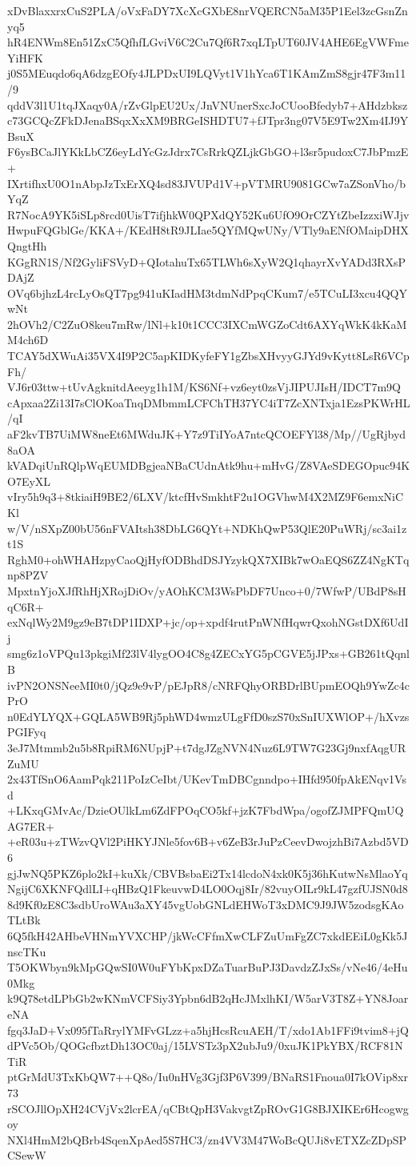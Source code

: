xDvBlaxxrxCuS2PLA/oVxFaDY7XcXcGXbE8nrVQERCN5aM35P1Eel3zcGsnZnyq5
hR4ENWm8En51ZxC5QfhfLGviV6C2Cu7Qf6R7xqLTpUT60JV4AHE6EgVWFmeYiHFK
j0S5MEuqdo6qA6dzgEOfy4JLPDxUI9LQVyt1V1hYca6T1KAmZmS8gjr47F3m11/9
qddV3l1U1tqJXaqy0A/rZvGlpEU2Ux/JnVNUnerSxcJoCUooBfedyb7+AHdzbksz
c73GCQcZFkDJenaBSqxXxXM9BRGeISHDTU7+fJTpr3ng07V5E9Tw2Xm4IJ9YBsuX
F6ysBCaJlYKkLbCZ6eyLdYcGzJdrx7CsRrkQZLjkGbGO+l3sr5pudoxC7JbPmzE+
IXrtifhxU0O1nAbpJzTxErXQ4sd83JVUPd1V+pVTMRU9081GCw7aZSonVho/bYqZ
R7NocA9YK5iSLp8rcd0UisT7ifjhkW0QPXdQY52Ku6UfO9OrCZYtZbeIzzxiWJjv
HwpuFQGblGe/KKA+/KEdH8tR9JLIae5QYfMQwUNy/VTly9aENfOMaipDHXQngtHh
KGgRN1S/Nf2GyliFSVyD+QIotahuTx65TLWh6sXyW2Q1qhayrXvYADd3RXsPDAjZ
OVq6bjhzL4rcLyOsQT7pg941uKIadHM3tdmNdPpqCKum7/e5TCuLI3xcu4QQYwNt
2hOVh2/C2ZuO8keu7mRw/lNl+k10t1CCC3IXCmWGZoCdt6AXYqWkK4kKaMM4ch6D
TCAY5dXWuAi35VX4I9P2C5apKIDKyfeFY1gZbsXHvyyGJYd9vKytt8LsR6VCpFh/
VJ6r03ttw+tUvAgknitdAeeyg1h1M/KS6Nf+vz6eyt0zsVjJIPUJIsH/IDCT7m9Q
cApxaa2Zi13I7sClOKoaTnqDMbmmLCFChTH37YC4iT7ZcXNTxja1EzsPKWrHL/qI
aF2kvTB7UiMW8neEt6MWduJK+Y7z9TiIYoA7ntcQCOEFYl38/Mp//UgRjbyd8aOA
kVADqiUnRQlpWqEUMDBgjeaNBaCUdnAtk9hu+mHvG/Z8VAeSDEGOpuc94KO7EyXL
vIry5h9q3+8tkiaiH9BE2/6LXV/ktcfHvSmkhtF2u1OGVhwM4X2MZ9F6emxNiCKl
w/V/nSXpZ00bU56nFVAItsh38DbLG6QYt+NDKhQwP53QlE20PuWRj/sc3ai1zt1S
RghM0+ohWHAHzpyCaoQjHyfODBhdDSJYzykQX7XIBk7wOaEQS6ZZ4NgKTqnp8PZV
MpxtnYjoXJfRhHjXRojDiOv/yAOhKCM3WsPbDF7Unco+0/7WfwP/UBdP8sHqC6R+
exNqlWy2M9gz9eB7tDP1IDXP+jc/op+xpdf4rutPnWNfHqwrQxohNGstDXf6UdIj
smg6z1oVPQu13pkgiMf23lV4lygOO4C8g4ZECxYG5pCGVE5jJPxs+GB261tQqnlB
ivPN2ONSNeeMI0t0/jQz9e9vP/pEJpR8/cNRFQhyORBDrlBUpmEOQh9YwZc4cPrO
n0EdYLYQX+GQLA5WB9Rj5phWD4wmzULgFfD0szS70xSnIUXWlOP+/hXvzsPGIFyq
3eJ7Mtmmb2u5b8RpiRM6NUpjP+t7dgJZgNVN4Nuz6L9TW7G23Gj9nxfAqgURZuMU
2x43TfSnO6AamPqk211PoIzCeIbt/UKevTmDBCgnndpo+IHfd950fpAkENqv1Vsd
+LKxqGMvAc/DzieOUlkLm6ZdFPOqCO5kf+jzK7FbdWpa/ogofZJMPFQmUQAG7ER+
+eR03u+zTWzvQVl2PiHKYJNle5fov6B+v6ZeB3rJuPzCeevDwojzhBi7Azbd5VD6
gjJwNQ5PKZ6plo2kI+kuXk/CBVBsbaEi2Tx14lcdoN4xk0K5j36hKutwNsMlaoYq
NgijC6XKNFQdlLI+qHBzQ1FkeuvwD4LO0Oqj8Ir/82vuyOILr9kL47gzfUJSN0d8
8d9Kf0zE8C3sdbUroWAu3aXY45vgUobGNLdEHWoT3xDMC9J9JW5zodsgKAoTLtBk
6Q5fkH42AHbeVHNmYVXCHP/jkWcCFfmXwCLFZuUmFgZC7xkdEEiL0gKk5JnscTKu
T5OKWbyn9kMpGQwSI0W0uFYbKpxDZaTuarBuPJ3DavdzZJxSs/vNe46/4eHu0Mkg
k9Q78etdLPbGb2wKNmVCFSiy3Ypbn6dB2qHcJMxlhKI/W5arV3T8Z+YN8JoareNA
fgq3JaD+Vx095fTaRrylYMFvGLzz+a5hjHcsRcuAEH/T/xdo1Ab1FFi9tvim8+jQ
dPVc5Ob/QOGcfbztDh13OC0aj/15LVSTz3pX2ubJu9/0xuJK1PkYBX/RCF81NTiR
ptGrMdU3TxKbQW7++Q8o/Iu0nHVg3Gjf3P6V399/BNaRS1Fnoua0I7kOVip8xr73
rSCOJllOpXH24CVjVx2lcrEA/qCBtQpH3VakvgtZpROvG1G8BJXIKEr6Hcogwgoy
NXl4HmM2bQBrb4SqenXpAed5S7HC3/zn4VV3M47WoBcQUJi8vETXZcZDpSPCSewW
